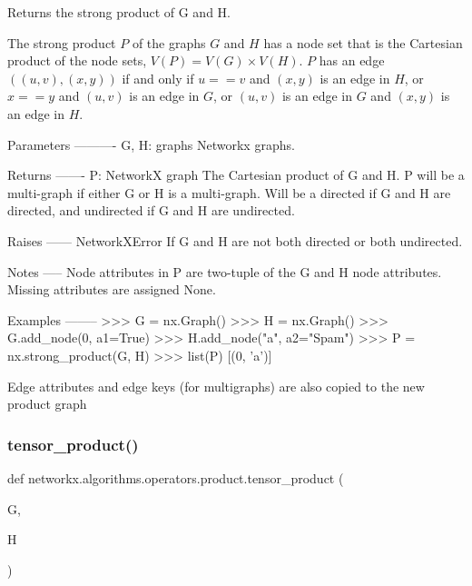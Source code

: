 \begin{DoxyVerb}Returns the strong product of G and H.

The strong product $P$ of the graphs $G$ and $H$ has a node set that
is the Cartesian product of the node sets, $V(P)=V(G) \times V(H)$.
$P$ has an edge $((u,v), (x,y))$ if and only if
$u==v$ and $(x,y)$ is an edge in $H$, or
$x==y$ and $(u,v)$ is an edge in $G$, or
$(u,v)$ is an edge in $G$ and $(x,y)$ is an edge in $H$.

Parameters
----------
G, H: graphs
 Networkx graphs.

Returns
-------
P: NetworkX graph
 The Cartesian product of G and H. P will be a multi-graph if either G
 or H is a multi-graph. Will be a directed if G and H are directed,
 and undirected if G and H are undirected.

Raises
------
NetworkXError
 If G and H are not both directed or both undirected.

Notes
-----
Node attributes in P are two-tuple of the G and H node attributes.
Missing attributes are assigned None.

Examples
--------
>>> G = nx.Graph()
>>> H = nx.Graph()
>>> G.add_node(0, a1=True)
>>> H.add_node("a", a2="Spam")
>>> P = nx.strong_product(G, H)
>>> list(P)
[(0, 'a')]

Edge attributes and edge keys (for multigraphs) are also copied to the
new product graph
\end{DoxyVerb}
 \mbox{\label{namespacenetworkx_1_1algorithms_1_1operators_1_1product_ac5acdf8fc9f1bdfa8a6f81c4fb7f55b5}} 
\subsubsection{\texorpdfstring{tensor\+\_\+product()}{tensor\_product()}}
{\footnotesize\ttfamily def networkx.\+algorithms.\+operators.\+product.\+tensor\+\_\+product (\begin{DoxyParamCaption}\item[{}]{G,  }\item[{}]{H }\end{DoxyParamCaption})}

